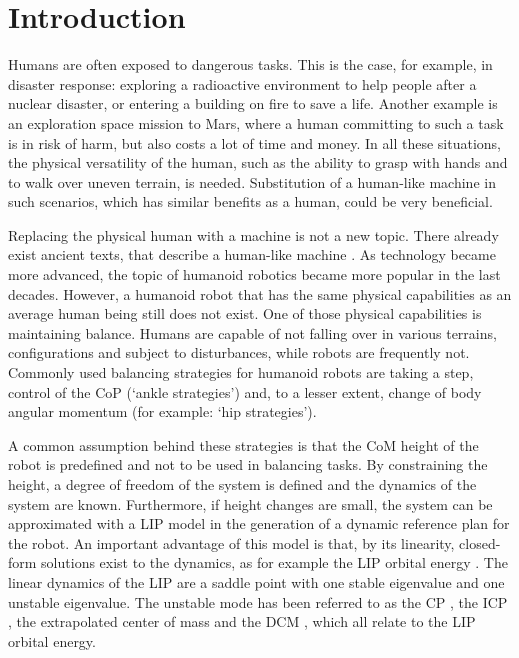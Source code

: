 %
\chapter{Introduction} \label{chap::intro}
Humans are often exposed to dangerous tasks. This is the case, for example, in disaster response: exploring a radioactive environment to help people after a nuclear disaster, or entering a building on fire to save a life. Another example is an exploration space mission to Mars, where a human committing to such a task is in risk of harm, but also costs a lot of time and money. In all these situations, the physical versatility of the human, such as the ability to grasp with hands and to walk over uneven terrain, is needed. Substitution of a human-like machine in such scenarios, which has similar benefits as a human, could be very beneficial. 

Replacing the physical human with a machine is not a new topic. There already exist ancient texts, that describe a human-like machine \cite{behnke2008humanoid}. As technology became more advanced, the topic of humanoid robotics became more popular in the last decades. However, a humanoid robot that has the same physical capabilities as an average human being still does not exist. One of those physical capabilities is maintaining balance. Humans are capable of not falling over in various terrains, configurations and subject to disturbances, while robots are frequently not. Commonly used balancing strategies for humanoid robots are taking a step, control of the \ac{CoP} (`ankle strategies') and, to a lesser extent, change of body angular momentum (for example: `hip strategies'). 

A common assumption behind these strategies is that the \ac{CoM} height of the robot is predefined and not to be used in balancing tasks. By constraining the height, a degree of freedom of the system is defined and the dynamics of the system are known. Furthermore, if height changes are small, the system can be approximated with a \ac{LIP} model \cite{kajita20013d} in the generation of a dynamic reference plan for the robot. An important advantage of this model is that, by its linearity, closed-form solutions exist to the dynamics, as for example the \ac{LIP} orbital energy \cite{kajita1992dynamic}. The linear dynamics of the \ac{LIP} are a saddle point with one stable eigenvalue and one unstable eigenvalue. The unstable mode has been referred to as the \ac{CP} \cite{pratt2006capture}, the \ac{ICP} \cite{koolen2012capturability}, the extrapolated center of mass \cite{hof2008extrapolated} and the \ac{DCM} \cite{takenaka2009real}, which all relate to the \ac{LIP} orbital energy. 

